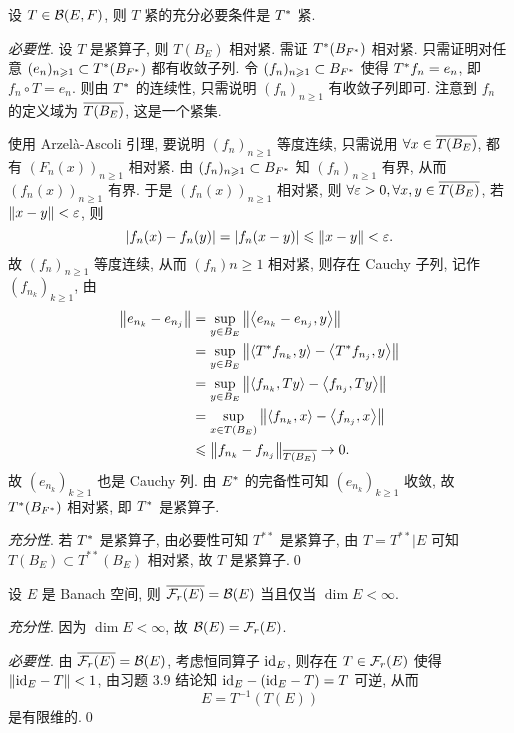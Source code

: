 	\begin{Theorem}
		设 $ T\in\CB(E, F) $, 则 $ T $ 紧的充分必要条件是 $ \Star{T} $ 紧.
	\end{Theorem}
	\begin{Proof}
		\textsl{必要性}. 设 $ T $ 是紧算子, 则 $ T(B_{E}) $ 相对紧. 需证 $ \Star{T}(B_{\Star{F}}) $ 相对紧. 只需证明对任意 $ (e_{n})_{n\geqslant1}\subset \Star{T}(B_{\Star{F}}) $ 都有收敛子列. 令 $ (f_{n})_{n\geqslant1}\subset B_{\Star{F}} $ 使得 $ \Star{T}f_{n}=e_{n} $, 即 $ f_{n}\circ T=e_{n} $. 则由 $ \Star{T} $ 的连续性, 只需说明 $ (f_{n})_{n\geqslant1} $ 有收敛子列即可. 注意到 $ f_{n} $ 的定义域为 $ \baro{T(B_{E})} $, 这是一个紧集.

		使用 Arzel\`a-Ascoli 引理, 要说明 $ (f_{n})_{n\geqslant1} $ 等度连续, 只需说用 $ \forall x\in\baro{T(B_{E})} $, 都有 $ (F_{n}(x))_{n\geqslant1} $ 相对紧. 由 $ (f_{n})_{n\geqslant1}\subset B_{\Star{F}} $ 知 $ (f_{n})_{n\geqslant1} $ 有界, 从而 $ (f_{n}(x))_{n\geqslant1} $ 有界. 于是 $ (f_{n}(x))_{n\geqslant1} $ 相对紧, 则 $ \forall\varepsilon>0, \forall x, y\in\baro{T(B_{E})} $, 若 $ \norm{x-y}<\varepsilon $, 则
		\[
			\abs{f_{n}(x)-f_{n}(y)} = \abs{f_{n}(x-y)}\leqslant\norm{x-y}<\varepsilon.
		\] 
		故 $ (f_{n})_{n\geqslant1} $ 等度连续, 从而 $ (f_{n}){n\geqslant1} $ 相对紧, 则存在 Cauchy 子列,
		记作 $ (f_{n_{k}})_{k\geqslant1} $, 由
		\[
			\begin{aligned}
				\norm{e_{n_{k}}-e_{n_{j}}} & = \sup_{y\in B_{E}}\norm{\lrangle{e_{n_{k}}-e_{n_{j}}, y}} \\
				& = \sup_{y\in B_{E}}\norm{\lrangle{\Star{T}f_{n_{k}}, y}-\lrangle{\Star{T}f_{n_{j}}, y}}\\
				& = \sup_{y\in B_{E}}\norm{\lrangle{f_{n_{k}}, Ty}-\lrangle{f_{n_{j}}, Ty}}\\
				& =  \sup_{x\in T(B_{E})}\norm{\lrangle{f_{n_{k}}, x}-\lrangle{f_{n_{j}}, x}}\\
				& \leqslant \norm{f_{n_{k}}-f_{n_{j}}}_{\baro{T(B_{E})}}\to 0.
			\end{aligned}
		\]
		故 $ (e_{n_{k}})_{k\geqslant1} $ 也是 Cauchy 列. 由 $ \Star{E} $ 的完备性可知 $ (e_{n_{k}})_{k\geqslant1} $ 收敛, 故 $ \Star{T}(B_{\Star{F}}) $ 相对紧, 即 $ \Star{T} $ 是紧算子.

		\textsl{充分性}. 若 $ \Star{T} $ 是紧算子, 由必要性可知 $ T^{**} $ 是紧算子, 由 $ T = T^{**}|E $ 可知 $ T(B_{E})\subset T^{**}(B_{E}) $ 相对紧, 故 $ T $ 是紧算子.\qed
	\end{Proof}

	\begin{Proposition}
		设 $ E $ 是 Banach 空间, 则 $ \baro{\Fr(E)}=\CB(E) $ 当且仅当 $ \dim E<\infty $.
	\end{Proposition}
	\begin{Proof}
		\textsl{充分性}. 因为 $ \dim E<\infty $, 故 $ \CB(E)=\Fr(E) $.

		\textsl{必要性}. 由 $ \baro{\Fr(E)}=\CB(E) $, 考虑恒同算子 $ \id_{E} $, 则存在 $ T\in\Fr(E) $ 使得 $ \norm{\id_{E}-T}<1 $, 由习题 3.9 结论知 $ \id_{E}-(\id_{E}-T)=T $ 可逆, 从而
		\[
			E = T^{-1}(T(E))
		\]
		是有限维的.\qed
	\end{Proof}

